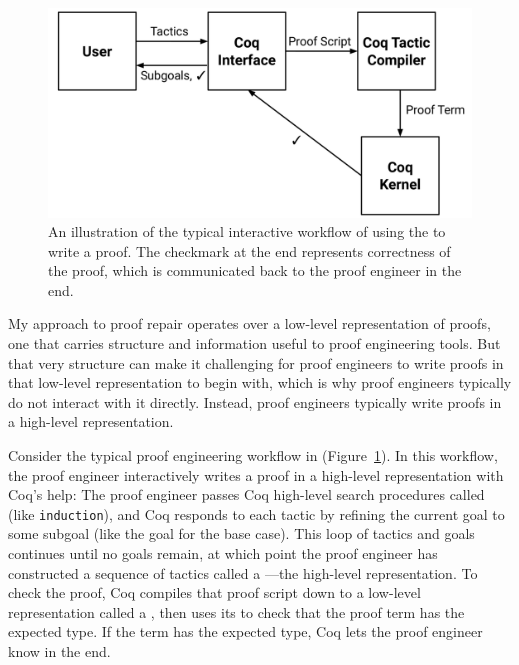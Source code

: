 \begin{figure}
\begin{center}
\includegraphics[scale=0.32]{Development}
\end{center}
\caption{An illustration of the typical interactive workflow of using the   to write a proof. The checkmark at the end
represents correctness of the proof, which is communicated back to the proof engineer in the end.}
\label{fig:workflow}
\end{figure}

My approach to proof repair operates over a low-level representation of proofs,
one that carries structure and information useful to proof engineering tools.
But that very structure can make it challenging for proof engineers to write proofs in that low-level representation
to begin with, which is why proof engineers typically do not interact with it directly.
Instead, proof engineers typically write proofs in a high-level representation.

Consider the typical proof engineering workflow in  (Figure~\ref{fig:workflow}).
In this workflow, the proof engineer interactively writes a proof in a high-level representation with Coq's help:
The proof engineer passes Coq high-level search procedures called  (like \lstinline{induction}), and Coq responds to each tactic
by refining the current goal to some subgoal (like the goal for the base case). This loop of tactics and goals 
continues until no goals remain, at which point the proof engineer has constructed a sequence of tactics called a ---the
high-level representation.
To check the proof, Coq compiles that proof script down to a low-level representation called a ,
then uses its  to check that the proof term has the expected type.
If the term has the expected type, Coq lets the proof engineer know in the end.

